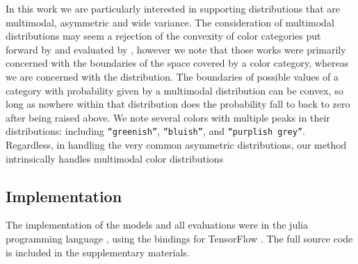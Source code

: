 In this work we are particularly interested in supporting distributions that are multimodal, asymmetric and wide variance.
The consideration of multimodal distributions may seem a rejection of the convexity of color categories put forward by \textcite{Gardenfors2000Cs} and evaluated by \textcite{jager2010natural}, however we note that those works were primarily concerned with the boundaries of the space covered by a color category, whereas we are concerned with the distribution.
The boundaries of possible values of a category with probability given by a multimodal distribution can be convex, so long as nowhere within that distribution does the probability fall to back to zero after being raised above. We note several colors with multiple peaks in their distributions: including \texttt{``greenish''}, \texttt{``bluish''}, and \texttt{``purplish grey''}.
Regardless, in handling the very common asymmetric distributions, our method intrinsically handles multimodal color distributions


\subsection{Implementation}
The implementation of the models and all evaluations were in the julia programming language \parencite{Julia},
using the bindings for TensorFlow \parencite{tensorflow2015-whitepaper}.
The full source code is included in the supplementary materials.